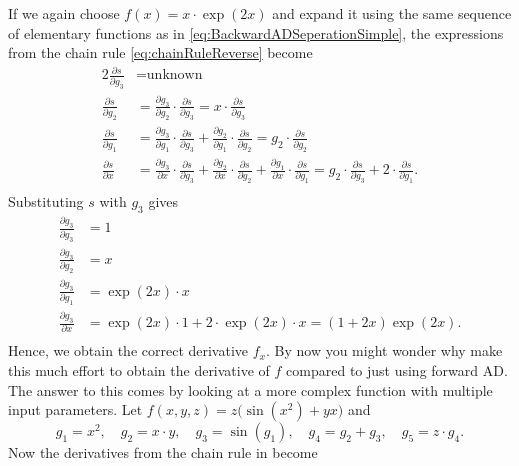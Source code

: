If we again choose  $f(x) = x\cdot\exp(2x)$ and expand it using the same sequence of elementary functions as in \eqref{eq:BackwardADSeperationSimple}, the expressions from the chain rule \eqref{eq:chainRuleReverse} become 
\begin{alignat*}{2}
    \frac{\partial s}{\partial g_3} &= \text{unknown}\\
    \frac{\partial s}{\partial g_2} &= \frac{\partial g_3}{\partial g_2} \cdot \frac{\partial s}{\partial g_3} = x\cdot \frac{\partial s}{\partial g_3} \\
    \frac{\partial s}{\partial g_1} &= \frac{\partial g_3}{\partial g_1}\cdot \frac{\partial s}{\partial g_3} + \frac{\partial g_2}{\partial g_1}\cdot \frac{\partial s}{\partial g_2} = g_2 \cdot \frac{\partial s}{\partial g_2} \\
    \frac{\partial s}{\partial x} &= \frac{\partial g_3}{\partial x}\cdot \frac{\partial s}{\partial g_3} + \frac{\partial g_2}{\partial x}\cdot \frac{\partial s}{\partial g_2} + \frac{\partial g_1}{\partial x}\cdot \frac{\partial s}{\partial g_1} = g_2\cdot \frac{\partial s}{\partial g_3} + 2\cdot \frac{\partial s}{\partial g_1}.\\
\end{alignat*}
Substituting $s$ with $g_3$ gives
\begin{align*}
    \frac{\partial g_3}{\partial g_3} &= 1\\
    \frac{\partial g_3}{\partial g_2} &= x\\
    \frac{\partial g_3}{\partial g_1} &= \exp(2x)\cdot x\\
    \frac{\partial g_3}{\partial x} &= \exp(2x)\cdot 1 + 2\cdot\exp(2x)\cdot x = (1 + 2x)\exp(2x).\\
\end{align*}
Hence, we obtain the correct derivative $f_x$. By now you might wonder why make this much effort to obtain the derivative of $f$ compared to just using forward AD. The answer to this comes by looking at a more complex function with multiple input parameters. Let $f(x,y,z) = z\bigl(\sin(x^2)+yx\bigr)$ and 
\begin{equation}
    g_1 = x^2, \quad g_2 = x\cdot y, \quad g_3 = \sin(g_1), \quad g_4 = g_2 + g_3, \quad g_5 = z\cdot g_4.
    \label{eq:DependencyBackwardAD}
\end{equation}
Now the derivatives from the chain rule in  become
